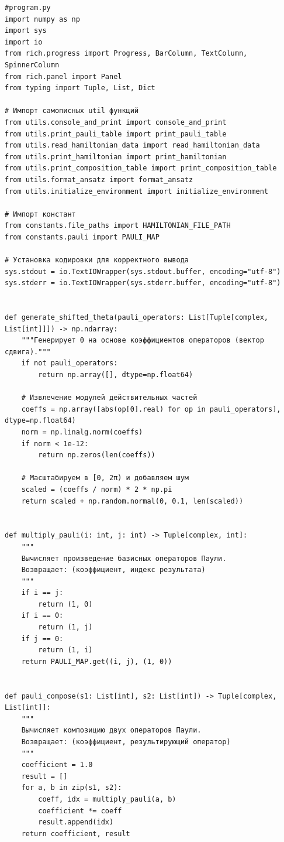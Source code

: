 \documentclass[a4paper]{report}
\begin{document}
\begin{lstlisting}
#program.py
import numpy as np
import sys
import io
from rich.progress import Progress, BarColumn, TextColumn, SpinnerColumn
from rich.panel import Panel
from typing import Tuple, List, Dict

# Импорт самописных util функций
from utils.console_and_print import console_and_print
from utils.print_pauli_table import print_pauli_table
from utils.read_hamiltonian_data import read_hamiltonian_data
from utils.print_hamiltonian import print_hamiltonian
from utils.print_composition_table import print_composition_table
from utils.format_ansatz import format_ansatz
from utils.initialize_environment import initialize_environment

# Импорт констант
from constants.file_paths import HAMILTONIAN_FILE_PATH
from constants.pauli import PAULI_MAP

# Установка кодировки для корректного вывода
sys.stdout = io.TextIOWrapper(sys.stdout.buffer, encoding="utf-8")
sys.stderr = io.TextIOWrapper(sys.stderr.buffer, encoding="utf-8")


def generate_shifted_theta(pauli_operators: List[Tuple[complex, List[int]]]) -> np.ndarray:
    """Генерирует θ на основе коэффициентов операторов (вектор сдвига)."""
    if not pauli_operators:
        return np.array([], dtype=np.float64)

    # Извлечение модулей действительных частей
    coeffs = np.array([abs(op[0].real) for op in pauli_operators], dtype=np.float64)
    norm = np.linalg.norm(coeffs)
    if norm < 1e-12:
        return np.zeros(len(coeffs))

    # Масштабируем в [0, 2π) и добавляем шум
    scaled = (coeffs / norm) * 2 * np.pi
    return scaled + np.random.normal(0, 0.1, len(scaled))


def multiply_pauli(i: int, j: int) -> Tuple[complex, int]:
    """
    Вычисляет произведение базисных операторов Паули.
    Возвращает: (коэффициент, индекс результата)
    """
    if i == j:
        return (1, 0)
    if i == 0:
        return (1, j)
    if j == 0:
        return (1, i)
    return PAULI_MAP.get((i, j), (1, 0))


def pauli_compose(s1: List[int], s2: List[int]) -> Tuple[complex, List[int]]:
    """
    Вычисляет композицию двух операторов Паули.
    Возвращает: (коэффициент, результирующий оператор)
    """
    coefficient = 1.0
    result = []
    for a, b in zip(s1, s2):
        coeff, idx = multiply_pauli(a, b)
        coefficient *= coeff
        result.append(idx)
    return coefficient, result



\end{lstlisting}
\end{document}
